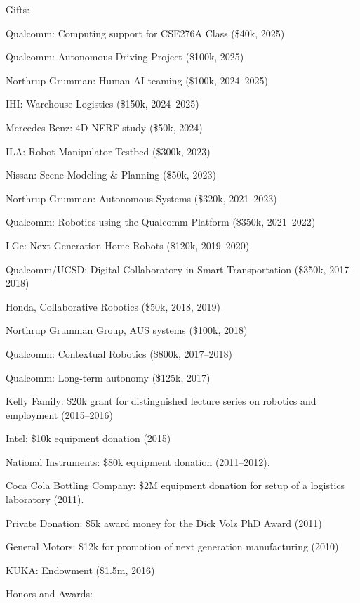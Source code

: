 \documentclass{article}
\begin{document}
\begin{cv}
	\begin{cvlist}{Gifts:}
		\item Qualcomm: Computing support for CSE276A Class (\$40k, 2025)
		\item Qualcomm: Autonomous Driving Project (\$100k, 2025)
		\item Northrup Grumman: Human-AI teaming (\$100k, 2024--2025)
		\item IHI: Warehouse Logistics (\$150k, 2024--2025)
		\item Mercedes-Benz: 4D-NERF study (\$50k, 2024)
		\item ILA: Robot Manipulator Testbed (\$300k, 2023)
		\item Nissan: Scene Modeling \& Planning (\$50k, 2023)
		\item Northrup Grumman: Autonomous Systems (\$320k, 2021--2023)
		\item Qualcomm: Robotics using the Qualcomm Platform (\$350k, 2021--2022)
		\item LGe: Next Generation Home Robots (\$120k, 2019--2020)
		\item Qualcomm/UCSD: Digital Collaboratory in Smart Transportation
		(\$350k, 2017--2018)
		\item Honda, Collaborative Robotics (\$50k, 2018, 2019)
		\item Northrup Grumman Group, AUS systems (\$100k, 2018)
		\item Qualcomm: Contextual Robotics (\$800k, 2017--2018)
		\item Qualcomm: Long-term autonomy (\$125k, 2017)
		\item Kelly Family: \$20k grant for distinguished lecture series on
		robotics and employment (2015--2016)
		\item Intel: \$10k equipment donation (2015)
		\item National Instruments: \$80k equipment donation (2011--2012).
		\item Coca Cola Bottling Company: \$2M equipment donation for setup of
		a logistics laboratory (2011).
		\item Private Donation: \$5k award money for the Dick Volz PhD Award
		(2011)
		\item General Motors: \$12k for promotion of next generation
		manufacturing (2010)
		\item KUKA: Endowment (\$1.5m, 2016)
	\end{cvlist}

	\begin{cvlist}{Honors and Awards:}


\end{cvlist}
\end{cv}
\end{document}

